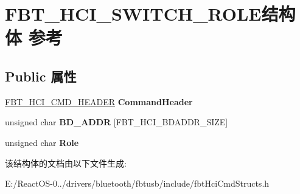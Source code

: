 \hypertarget{struct_f_b_t___h_c_i___s_w_i_t_c_h___r_o_l_e}{}\section{F\+B\+T\+\_\+\+H\+C\+I\+\_\+\+S\+W\+I\+T\+C\+H\+\_\+\+R\+O\+L\+E结构体 参考}
\label{struct_f_b_t___h_c_i___s_w_i_t_c_h___r_o_l_e}
\subsection*{Public 属性}
\begin{DoxyCompactItemize}
\item 
\mbox{\label{struct_f_b_t___h_c_i___s_w_i_t_c_h___r_o_l_e_a229fd81882b4c2b7dcff564a7410bb59}} 
\hyperlink{struct_f_b_t___h_c_i___c_m_d___h_e_a_d_e_r}{F\+B\+T\+\_\+\+H\+C\+I\+\_\+\+C\+M\+D\+\_\+\+H\+E\+A\+D\+ER} {\bfseries Command\+Header}
\item 
\mbox{\label{struct_f_b_t___h_c_i___s_w_i_t_c_h___r_o_l_e_a1c050136629add91a4986d7265302f32}} 
unsigned char {\bfseries B\+D\+\_\+\+A\+D\+DR} \mbox{[}F\+B\+T\+\_\+\+H\+C\+I\+\_\+\+B\+D\+A\+D\+D\+R\+\_\+\+S\+I\+ZE\mbox{]}
\item 
\mbox{\label{struct_f_b_t___h_c_i___s_w_i_t_c_h___r_o_l_e_a207c005de20db3d1a42dc22db642cef1}} 
unsigned char {\bfseries Role}
\end{DoxyCompactItemize}


该结构体的文档由以下文件生成\+:\begin{DoxyCompactItemize}
\item 
E\+:/\+React\+O\+S-\/0../drivers/bluetooth/fbtusb/include/fbt\+Hci\+Cmd\+Structs.\+h\end{DoxyCompactItemize}
